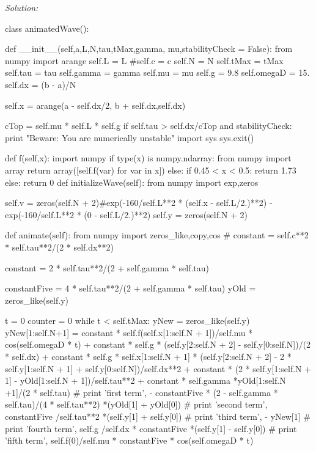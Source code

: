 \ifsolutions
\textit{Solution:}\\
\begin{codeexample}
\begin{VerbatimOut}{\listingFile}
class animatedWave():

    def __init__(self,a,L,N,tau,tMax,gamma, mu,stabilityCheck = False):
        from numpy import arange
        self.L = L
        #self.c = c
        self.N = N
        self.tMax = tMax
        self.tau = tau
        self.gamma = gamma
        self.mu = mu
        self.g = 9.8
        self.omegaD = 15.
        self.dx = (b - a)/N

        
        self.x = arange(a - self.dx/2, b + self.dx,self.dx)

        cTop = self.mu * self.L * self.g
        if self.tau > self.dx/cTop and stabilityCheck:
            print "Beware: You are numerically unstable"
            import sys
            sys.exit()

    def f(self,x):
        import numpy
        if type(x) is numpy.ndarray:
            from numpy import array
            return array([self.f(var) for var in x])
        else:
            if   0.45 < x < 0.5:
                return 1.73
            else:
                return 0
    def initializeWave(self):
        from numpy import exp,zeros

        self.v = zeros(self.N + 2)#exp(-160/self.L**2 * (self.x - self.L/2.)**2) - exp(-160/self.L**2 * (0 - self.L/2.)**2)
        self.y = zeros(self.N + 2)

    def animate(self):
        from numpy import zeros_like,copy,cos
        #        constant = self.c**2 * self.tau**2/(2 * self.dx**2)

        constant = 2 * self.tau**2/(2 + self.gamma * self.tau)

        constantFive = 4 * self.tau**2/(2 + self.gamma * self.tau)
        yOld = zeros_like(self.y)

        t = 0
        counter = 0
        while t < self.tMax:
            yNew = zeros_like(self.y)
            yNew[1:self.N+1] = constant * self.f(self.x[1:self.N + 1])/self.mu * cos(self.omegaD * t) + constant * self.g * (self.y[2:self.N + 2] - self.y[0:self.N])/(2 * self.dx) + constant * self.g * self.x[1:self.N + 1] * (self.y[2:self.N + 2] - 2 * self.y[1:self.N + 1] + self.y[0:self.N])/self.dx**2 + constant * (2 * self.y[1:self.N + 1] - yOld[1:self.N + 1])/self.tau**2 + constant * self.gamma *yOld[1:self.N +1]/(2 * self.tau)
#            print 'first term', - constantFive * (2 - self.gamma * self.tau)/(4 * self.tau**2) *(yOld[1] + yOld[0])
#            print 'second term',  constantFive /self.tau**2 *(self.y[1] + self.y[0])
#            print 'third term', - yNew[1]
#            print 'fourth term', self.g /self.dx * constantFive *(self.y[1] - self.y[0])
#            print 'fifth term',   self.f(0)/self.mu * constantFive * cos(self.omegaD * t)
            

\end{VerbatimOut}
\end{codeexample}

